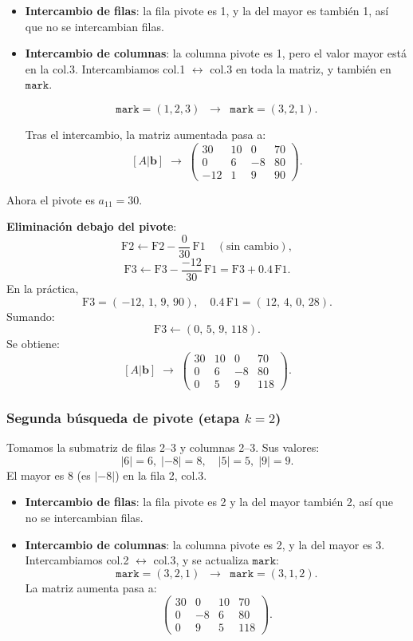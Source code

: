 \begin{itemize}
\item \textbf{Intercambio de filas}: 
   la fila pivote es 1, y la del mayor es también 1, así que no se intercambian filas.

\item \textbf{Intercambio de columnas}:
   la columna pivote es 1, pero el valor mayor está en la col.3.
   Intercambiamos col.1 \(\leftrightarrow\) col.3 en toda la matriz, y también en \(\texttt{mark}\).

   \[
   \texttt{mark}=(1,2,3)\;\;\longrightarrow\;\;\texttt{mark}=(3,2,1).
   \]

   Tras el intercambio, la matriz aumentada pasa a:
   \[
   [A|\mathbf{b}]
   \;\longrightarrow\;
   \begin{pmatrix}
   30 & 10 & 0 & 70\\
   0 & 6 & -8 & 80\\
   -12 & 1 & 9 & 90
   \end{pmatrix}.
   \]
\end{itemize}

Ahora el pivote es \(a_{11}=30\).

\textbf{Eliminación debajo del pivote}:
\[
\text{F2} \leftarrow \text{F2} - \frac{0}{30}\,\text{F1} \quad(\text{sin cambio}),
\]
\[
\text{F3} \leftarrow \text{F3} - \frac{-12}{30}\,\text{F1} 
= \text{F3} + 0.4\,\text{F1}.
\]
En la práctica,
\[
\text{F3}=(\,{-12},\,1,\,9,\,90),\quad
0.4\,\text{F1}=(\,12,\,4,\,0,\,28).
\]
Sumando:
\[
\text{F3}\leftarrow(0,\,5,\,9,\,118).
\]
Se obtiene:
\[
[A|\mathbf{b}]\;\to\;
\begin{pmatrix}
30 & 10 & 0 & 70\\
0 & 6 & -8 & 80\\
0 & 5 & 9 & 118
\end{pmatrix}.
\]

\subsubsection{Segunda búsqueda de pivote (etapa \(k=2\))}

Tomamos la submatriz de filas 2--3 y columnas 2--3. Sus valores:
\[
|6|=6, \;|{-8}|=8,
\quad
|5|=5,\;|9|=9.
\]
El mayor es \(8\) (es \(\lvert -8\rvert\)) en la fila 2, col.3.

\begin{itemize}
\item \textbf{Intercambio de filas}:
   la fila pivote es 2 y la del mayor también 2, así que no se intercambian filas.
\item \textbf{Intercambio de columnas}:
   la columna pivote es 2, y la del mayor es 3. Intercambiamos col.2 \(\leftrightarrow\) col.3, y se actualiza \(\texttt{mark}\):
   \[
   \texttt{mark}=(3,2,1)\;\;\longrightarrow\;\;\texttt{mark}=(3,1,2).
   \]
   La matriz aumenta pasa a:
   \[
   \begin{pmatrix}
   30 & 0 & 10 & 70\\
   0 & -8 & 6 & 80\\
   0 & 9 & 5 & 118
   \end{pmatrix}.
   \]
\end{itemize}

